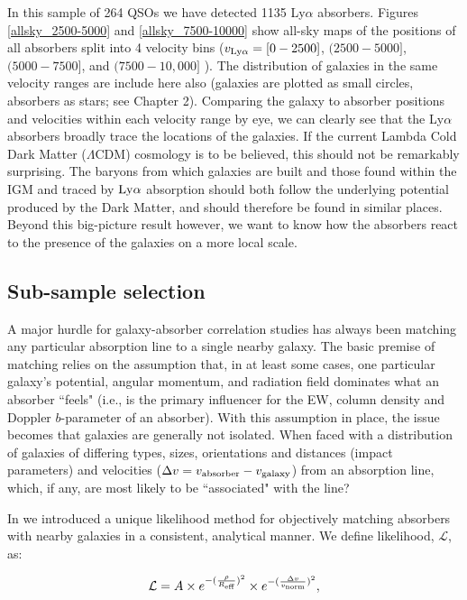 In this sample of 264 QSOs we have detected 1135 Ly$\alpha$ absorbers. Figures \ref{allsky_2500-5000} and \ref{allsky_7500-10000} show all-sky maps of the positions of all absorbers split into 4 velocity bins ($v_{\rm Ly\alpha} = [0 - 2500]$, $(2500 - 5000]$, $(5000 - 7500]$, and $(7500 - 10,000]$ \kms). The distribution of galaxies in the same velocity ranges are include here also (galaxies are plotted as small circles, absorbers as stars; see Chapter 2). Comparing the galaxy to absorber positions and velocities within each velocity range by eye, we can clearly see that the Ly$\alpha$ absorbers broadly trace the locations of the galaxies. If the current Lambda Cold Dark Matter ($\Lambda$CDM) cosmology is to be believed, this should not be remarkably surprising. The baryons from which galaxies are built and those found within the IGM and traced by $\rm Ly\alpha$ absorption should both follow the underlying potential produced by the Dark Matter, and should therefore be found in similar places. Beyond this big-picture result however, we want to know how the absorbers react to the presence of the galaxies on a more local scale.


\subsection{Sub-sample selection}

A major hurdle for galaxy-absorber correlation studies has always been matching any particular absorption line to a single nearby galaxy. The basic premise of matching relies on the assumption that, in at least some cases, one particular galaxy's potential, angular momentum, and radiation field dominates what an absorber ``feels" (i.e., is the primary influencer for the EW, column density and Doppler $b$-parameter of an absorber). With this assumption in place, the issue becomes that galaxies are generally not isolated. When faced with a distribution of galaxies of differing types, sizes, orientations and distances (impact parameters) and velocities ($\Delta v = v_{\rm absorber} - v_{\rm galaxy}$) from an absorption line, which, if any, are most likely to be ``associated" with the line? 

In \cite{french2017} we introduced a unique likelihood method for objectively matching absorbers with nearby galaxies in a consistent, analytical manner. We define likelihood, $\mathcal{L}$, as: 

\begin{equation}
\mathcal{L} = A \times e^{-(\frac{\rho}{R_{\rm eff}})^2} \times e^{-(\frac{\Delta v}{v_{\rm norm}})^2},
\label{likelihood}
\end{equation}

